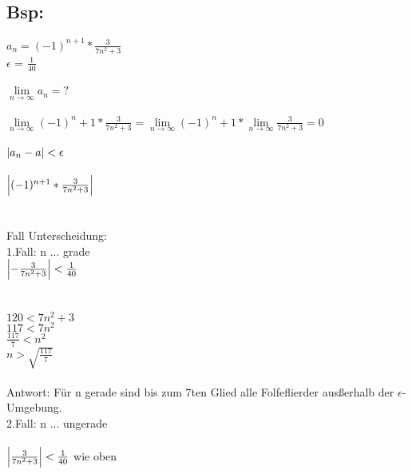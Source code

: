 \documentclass[../mainfile.tex]{subfile}
\author{Barbara Wiedermann}
\begin{document}
\subsection*{Bsp:}
$a_n = (-1)^{n+1} * \frac{3}{7n^2 + 3}$\\
$\epsilon$ = $\frac{1}{40}$\\\\
$\lim\limits_{n \to \infty} a_n = ?$\\\\
$\lim\limits_{n \to \infty} (-1)^n+1 * \frac{3}{7n^2 + 3} = \lim\limits_{n \to \infty} (-1)^n+1 * \lim\limits_{n \to \infty}\frac{3}{7n^2 + 3} = 0$\\\\
$\abs*{a_n - a} < \epsilon$\\\\
$\abs*{ (-1)^{n+1} * \frac{3}{7n^2 + 3}} $ \\\\\\
Fall Unterscheidung:\\
1.Fall: n ... grade\\
$\abs*{ - \frac{3}{7n^2 + 3}} < \frac{1}{40}$\\\\\\
$120 < 7n^2 + 3$\\
$117 < 7n^2$\\
$\frac{117}{7} < n^2$\\
$n > \sqrt{\frac{117}{7}}$\\\\
Antwort: Für n gerade sind bis zum 7ten Glied alle Folfeflierder ausßerhalb der $\epsilon$-Umgebung.\\
2.Fall: n ... ungerade\\\\
$\abs*{\frac{3}{7n^2 + 3}} < \frac{1}{40}$ wie oben
\end{document}
